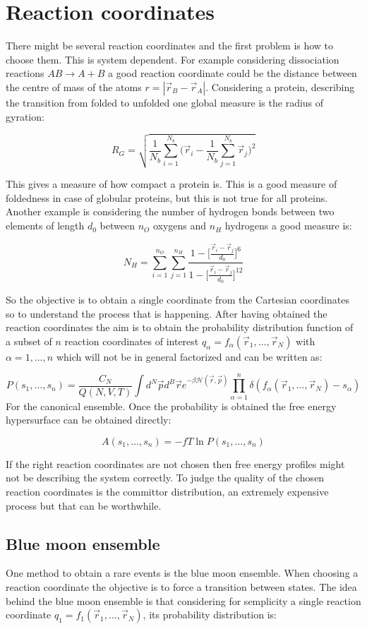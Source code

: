 \section{Reaction coordinates}
There might be several reaction coordinates and the first problem is how to choose them.
This is system dependent.
For example considering dissociation reactions $AB\rightarrow A+B$ a good reaction coordinate could be the distance between the centre of mass of the atoms $r = |\vec{r}_B-\vec{r}_A|$.
Considering a protein, describing the transition from folded to unfolded one global measure is the radius of gyration:

$$R_G = \sqrt{\frac{1}{N_b}\sum\limits_{i=1}^{N_b}\biggl(\vec{r}_i-\frac{1}{N_b}\sum\limits_{j=1}^{N_b}\vec{r}_j\biggr)^2}$$

This gives a measure of how compact a protein is.
This is a good measure of foldedness in case of globular proteins, but this is not true for all proteins.
Another example is considering the number of hydrogen bonds between two elements of length $d_0$ between $n_O$ oxygens and $n_H$ hydrogens a good measure is:

$$N_H = \sum\limits_{i=1}^{n_O}\sum\limits_{j=1}^{n_H}\frac{1-\biggl[\frac{\vec{r}_i-\vec{r}_j}{d_0}\biggr]^6}{1-\biggl[\frac{\vec{r}_i-\vec{r}_j}{d_0}\biggr]^{12}}$$

So the objective is to obtain a single coordinate from the Cartesian coordinates so to understand the process that is happening.
After having obtained the reaction coordinates the aim is to obtain the probability distribution function of a subset of $n$ reaction coordinates of interest $q_\alpha= f_\alpha(\vec{r}_1, \dots, \vec{r}_N)$ with $\alpha = 1, \dots, n$ which will not be in general factorized and can be written as:

$$P(s_1, \dots, s_n) = \frac{C_N}{Q(N, V, T)}\int d^N\vec{p}d^B\vec{r}e^{-\beta\mathcal{H}(\vec{r}, \vec{p})}\prod\limits_{\alpha=1}^n\delta(f_\alpha(\vec{r}_1, \dots, \vec{r}_N)-s_\alpha)$$
For the canonical ensemble.
Once the probability is obtained the free energy hypersurface can be obtained directly:

$$A(s_1, \dots, s_n) = -fT\ln P(s_1, \dots, s_n)$$

If the right reaction coordinates are not chosen then free energy profiles might not be describing the system correctly.
To judge the quality of the chosen reaction coordinates is the committor distribution, an extremely expensive process but that can be worthwhile.

	\subsection{Blue moon ensemble}
	One method to obtain a rare events is the blue moon ensemble.
	When choosing a reaction coordinate the objective is to force a transition between states.
	The idea behind the blue moon ensemble is that considering for semplicity a single reaction coordinate $q_1 = f_1(\vec{r}_1, \dots, \vec{r}_N)$, its probability distribution is:

